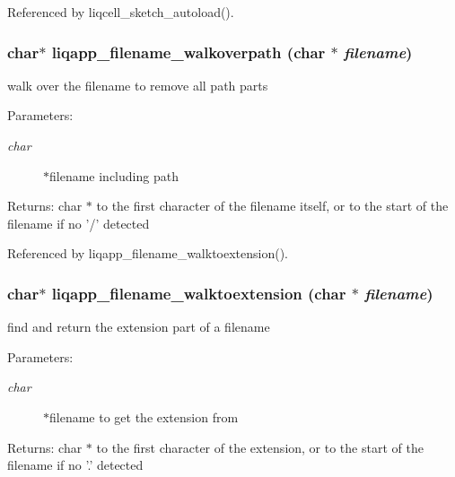 Referenced by liqcell\_\-sketch\_\-autoload().
\subsubsection[{liqapp\_\-filename\_\-walkoverpath}]{\setlength{\rightskip}{0pt plus 5cm}char$\ast$ liqapp\_\-filename\_\-walkoverpath (char $\ast$ {\em filename})}\label{d7/dbc/liqapp_8c_01fd5f86c560fbe38a9fad4dbab80f1e}


walk over the filename to remove all path parts \begin{Desc}
\item[Parameters:]
\begin{description}
\item[{\em char}]$\ast$filename including path \end{description}
\end{Desc}
\begin{Desc}
\item[Returns:]char $\ast$ to the first character of the filename itself, or to the start of the filename if no '/' detected \end{Desc}


Referenced by liqapp\_\-filename\_\-walktoextension().
\subsubsection[{liqapp\_\-filename\_\-walktoextension}]{\setlength{\rightskip}{0pt plus 5cm}char$\ast$ liqapp\_\-filename\_\-walktoextension (char $\ast$ {\em filename})}\label{d7/dbc/liqapp_8c_ff90e989619ed0a811ef6aa3ba03b978}


find and return the extension part of a filename \begin{Desc}
\item[Parameters:]
\begin{description}
\item[{\em char}]$\ast$filename to get the extension from \end{description}
\end{Desc}
\begin{Desc}
\item[Returns:]char $\ast$ to the first character of the extension, or to the start of the filename if no '.' detected \end{Desc}


